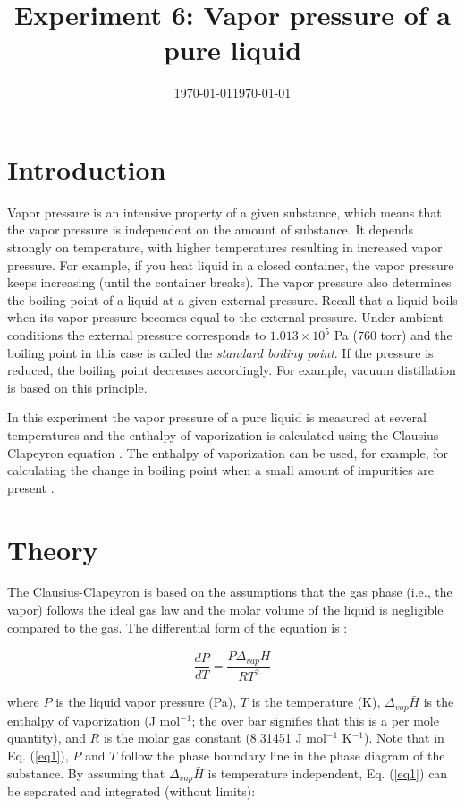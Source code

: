 \documentclass[byrevtex,amssymb,aps,pra,floatfix,letterpaper]{revtex4}
\date{\today}
\begin{document}
\title{Experiment 6: Vapor pressure of a pure liquid}

\date{\today}

\maketitle

\section{Introduction}
Vapor pressure is an intensive property of a given substance, which means that the vapor pressure is independent on the amount of substance. It depends strongly on temperature, with higher temperatures resulting in increased vapor pressure. For example, if you heat liquid in a closed container, the vapor pressure keeps increasing (until the container breaks). The vapor pressure also determines the boiling point of a liquid at a given external pressure. Recall that a liquid boils when its vapor pressure becomes equal to the external pressure. Under ambient conditions the external pressure corresponds to $1.013\times 10^5$ Pa (760 torr) and the boiling point in this case is called the \textit{standard boiling point}. If the pressure is reduced, the boiling point decreases accordingly. For example, vacuum distillation is based on this principle.

In this experiment the vapor pressure of a pure liquid is measured at several temperatures and the enthalpy of vaporization is calculated using the Clausius-Clapeyron equation \cite{SILBEY,ATKINS1,TNOTES}. The enthalpy of vaporization can be used, for example, for calculating the change in boiling point when a small amount of impurities are  present \cite{ATKINS1,TNOTES}.

\section{Theory}
The Clausius-Clapeyron is based on the assumptions that the gas phase (i.e., the vapor) follows the ideal gas law and the molar volume of the liquid is negligible compared to the gas. The differential form of the equation is \cite{SILBEY,ATKINS1,TNOTES}:

\begin{equation}
\label{eq1}
\frac{dP}{dT} = \frac{P\Delta_{vap}\bar{H}}{RT^2}
\end{equation}

\noindent
where $P$ is the liquid vapor pressure (Pa), $T$ is the temperature (K), $\Delta_{vap}\bar{H}$ is the enthalpy of vaporization (J mol$^{-1}$; the over bar signifies that this is a per mole quantity), and $R$ is the molar gas constant (8.31451 J mol$^{-1}$ K$^{-1}$). Note that in Eq. (\ref{eq1}), $P$ and $T$ follow the phase boundary line in the phase diagram of the substance. By assuming that $\Delta_{vap}\bar{H}$ is temperature independent, Eq. (\ref{eq1}) can be separated and integrated (without limits):
\end{document}
